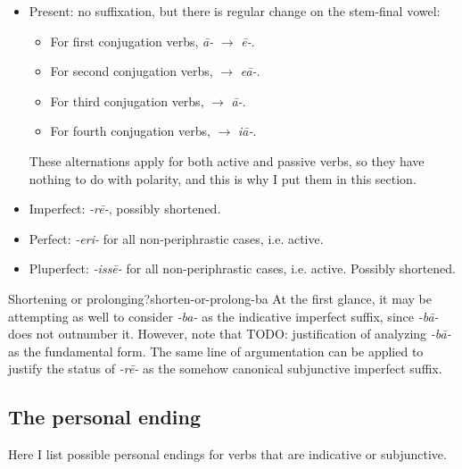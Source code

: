 \documentclass[a4paper, oneside]{report}
\newcommand{\form}[1]{\emph{#1}}
\begin{document}
\begin{itemize}
    \begin{itemize}
        \item Present: no suffixation, but there is regular change on the stem-final vowel:
        \begin{itemize}
            \item For first conjugation verbs, \form{\={a}-} $\to$ \form{\={e}-}.
            \item For second conjugation verbs, \form{} $\to$ \form{e\={a}-}.
            \item For third conjugation verbs, $\to$ \form{\={a}-}.
            \item For fourth conjugation verbs, $\to$ \form{i\={a}-}.
        \end{itemize}
        These alternations apply for both active and passive verbs,
        so they have nothing to do with polarity, and this is why I put them in this section.
        \item Imperfect: \form{-r\={e}-}, possibly shortened.
        \item Perfect: \form{-eri-} for all non-periphrastic cases, i.e. active.
        \item Pluperfect: \form{-iss\={e}-} for all non-periphrastic cases, i.e. active.
        Possibly shortened.
    \end{itemize}
\end{itemize}

\begin{infobox}{Shortening or prolonging?}{shorten-or-prolong-ba}
    At the first glance, it may be attempting as well to consider \form{-ba-} as 
    the indicative imperfect suffix,
    since \form{-b\={a}-} does not outnumber it.
    However, note that TODO: justification of analyzing \form{-b\={a}-} as the fundamental form.
    The same line of argumentation can be applied to justify the status of \form{-r\={e}-}
    as the somehow canonical subjunctive imperfect suffix.
\end{infobox}

\subsection{The personal ending}

Here I list possible personal endings for verbs that are indicative or subjunctive. 
\end{document}
